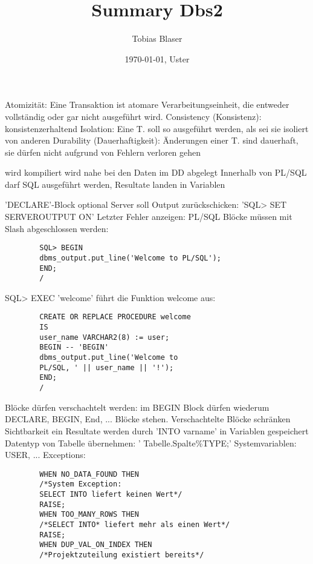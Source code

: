 \documentclass[ngerman,a4paper,12pt]{scrreprt}
\title{Summary Dbs2}
\author{Tobias Blaser}
\date{\today{}, Uster}
\begin{document}
\tableofcontents
\clearpage




\ul
	\li Atomizität: Eine Transaktion ist atomare Verarbeitungseinheit, die entweder vollständig oder gar
nicht ausgeführt wird.
	\li Consistency (Konsistenz): konsistenzerhaltend 
	\li Isolation: Eine T. soll so ausgeführt werden, als sei sie
isoliert von anderen
	\li Durability (Dauerhaftigkeit): Änderungen einer T.
sind dauerhaft, sie dürfen nicht aufgrund von Fehlern
verloren gehen
\ulE


\ul
	\li wird kompiliert
	\li wird nahe bei den Daten im DD abgelegt
	\li Innerhalb von PL/SQL darf SQL ausgeführt werden, Resultate landen in Variablen
\ulE

\ul
	\li 'DECLARE'-Block optional
	\li Server soll Output zurückschicken: 'SQL> SET SERVEROUTPUT ON'
	\li Letzter Fehler anzeigen: 
	\li PL/SQL Blöcke müssen mit Slash abgeschlossen werden:
		\begin{verbatim}
		SQL> BEGIN
		dbms_output.put_line('Welcome to PL/SQL');
		END;
		/
		\end{verbatim}
	\li SQL> EXEC 'welcome' führt die Funktion welcome aus:
		\begin{verbatim}
		CREATE OR REPLACE PROCEDURE welcome
		IS
		user_name VARCHAR2(8) := user;
		BEGIN -- 'BEGIN'
		dbms_output.put_line('Welcome to
		PL/SQL, ' || user_name || '!');
		END;
		/
		\end{verbatim}
	\li Blöcke dürfen verschachtelt werden: im BEGIN Block dürfen wiederum DECLARE, BEGIN, End, ... Blöcke stehen.
	\li Verschachtelte Blöcke schränken Sichtbarkeit ein
	\li Resultate werden durch 'INTO varname' in Variablen gespeichert
	\li Datentyp von Tabelle übernehmen: ' Tabelle.Spalte\%TYPE;'
	\li Systemvariablen: USER, ...
	\li Exceptions:
		\begin{verbatim}
		WHEN NO_DATA_FOUND THEN
		/*System Exception:
		SELECT INTO liefert keinen Wert*/
		RAISE;
		WHEN TOO_MANY_ROWS THEN
		/*SELECT INTO* liefert mehr als einen Wert*/
		RAISE;
		WHEN DUP_VAL_ON_INDEX THEN
		/*Projektzuteilung existiert bereits*/
		\end{verbatim}
\ulE
\end{document}
